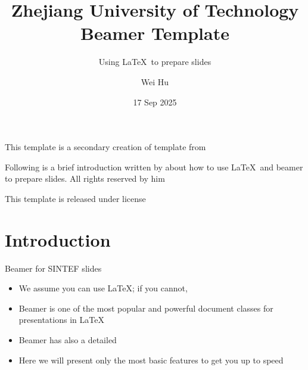 \documentclass{beamer}
\title{Zhejiang University of Technology Beamer Template}
\subtitle{Using \LaTeX\ to prepare slides}
\author{Wei Hu}
\date{17 Sep 2025}
\begin{document}
    
    \maketitle
    
    \begin{frame}
        This template is a secondary creation of  template from  \vspace{\baselineskip}
        
        Following is a brief introduction written by  about how to use \LaTeX\ and beamer to prepare slides. All rights reserved by him\vspace{\baselineskip}
        
        This template is released under  license
    \end{frame}
    
    \section{Introduction}
    
    \begin{frame}{Beamer for SINTEF slides}
        \begin{itemize}
            \item We assume you can use \LaTeX; if you cannot, 
            \item Beamer is one of the most popular and powerful document classes for presentations in \LaTeX
            \item Beamer has also a detailed 
            \item Here we will present only the most basic features to get you up to speed
        \end{itemize}
    \end{frame}
    
\end{document}
